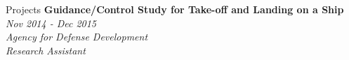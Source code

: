 \documentclass{resume} %
\begin{document}
\begin{rSection}{Projects}
{\bf Guidance/Control Study for Take-off and Landing on a Ship} \hfill {\em Nov 2014 - Dec 2015} 
\\{\textit{ Agency for Defense Development}}
\\{\textit{ Research Assistant}}



\end{rSection}


%
%
%
%
% 
%
%
%

%
%
%





\end{document}
